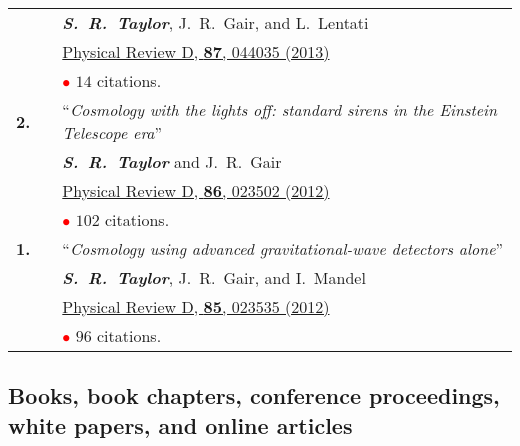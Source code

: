\documentclass[11pt,letterpaper,sans]{moderncv}
\begin{document}
{\begin{longtable}{rp{0.3cm}p{15.8cm}}
&& \textit{\textbf{S.~R.~Taylor}}, J.~R.~Gair, and L.~Lentati \\ 
&& \href{http://journals.aps.org/prd/abstract/10.1103/PhysRevD.87.044035}{{\color{color1} Physical Review D, \textbf{87}, 044035 (2013)}} \\
&& \textcolor{red}{$\bullet$} $14$ citations. \vspace{0.09cm}\\
\textbf{2.} & & ``\textit{Cosmology with the lights off: standard sirens in the Einstein Telescope era}'' \\ 
&& \textit{\textbf{S.~R.~Taylor}} and J.~R.~Gair \\ 
&& \href{http://journals.aps.org/prd/abstract/10.1103/PhysRevD.86.023502}{{\color{color1} Physical Review D, \textbf{86}, 023502 (2012)}} \\
&& \textcolor{red}{$\bullet$} $102$ citations. \vspace{0.09cm}\\
\textbf{1.} & & ``\textit{Cosmology using advanced gravitational-wave detectors alone}'' \\ 
&& \textit{\textbf{S.~R.~Taylor}}, J.~R.~Gair, and I.~Mandel \\ 
&& \href{http://journals.aps.org/prd/abstract/10.1103/PhysRevD.85.023535}{{\color{color1} Physical Review D, \textbf{85}, 023535 (2012)}} \\
&& \textcolor{red}{$\bullet$} $96$ citations. \vspace{0.09cm}\\
\end{longtable}
}

\subsection{Books, book chapters, conference proceedings, white papers, and online articles} \vspace{-0.4cm}
\end{document}
